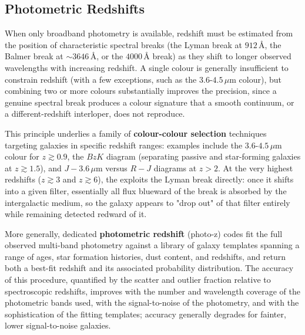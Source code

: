 \subsection{Photometric Redshifts} \label{subsec:photo_z}

\begin{minipage}{0.55\textwidth}
When only broadband photometry is available, redshift must be estimated from the position of characteristic spectral breaks (the Lyman break at $912\,\text{\AA}$, the Balmer break at $\sim 3646\,\text{\AA}$, or the $4000\,\text{\AA}$ break) as they shift to longer observed wavelengths with increasing redshift. A single colour is generally insufficient to constrain redshift (with a few exceptions, such as the $3.6$-$4.5\,\mu\text{m}$ colour), but combining two or more colours substantially improves the precision, since a genuine spectral break produces a colour signature that a smooth continuum, or a different-redshift interloper, does not reproduce.
\end{minipage}%
\hfill
\begin{minipage}{0.4\textwidth}
    \centering
\end{minipage}

\medskip

This principle underlies a family of \textbf{colour-colour selection} techniques targeting galaxies in specific redshift ranges: examples include the $3.6$-$4.5\,\mu\text{m}$ colour for $z \gtrsim 0.9$, the $BzK$ diagram (separating passive and star-forming galaxies at $z \gtrsim 1.5$), and $J - 3.6\,\mu\text{m}$ versus $R - J$ diagrams at $z > 2$. At the very highest redshifts ($z \gtrsim 3$ and $z \gtrsim 6$), the  exploits the Lyman break directly: once it shifts into a given filter, essentially all flux blueward of the break is absorbed by the intergalactic medium, so the galaxy appears to "drop out" of that filter entirely while remaining detected redward of it.

\medskip

More generally, dedicated \textbf{photometric redshift} (photo-z) codes fit the full observed multi-band photometry against a library of galaxy templates spanning a range of ages, star formation histories, dust content, and redshifts, and return both a best-fit redshift and its associated probability distribution. The accuracy of this procedure, quantified by the scatter and outlier fraction relative to spectroscopic redshifts, improves with the number and wavelength coverage of the photometric bands used, with the signal-to-noise of the photometry, and with the sophistication of the fitting templates; accuracy generally degrades for fainter, lower signal-to-noise galaxies.

